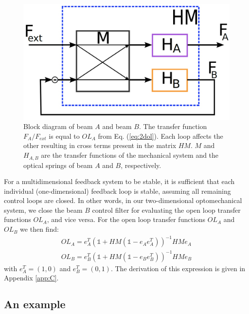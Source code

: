 \begin{figure}[htbp]
\begin{center}
		\includegraphics[width=.7\textwidth]{figures/theory/block_mimo_paper2c.png}
	\caption[Block diagram of beam $A$ and beam $B$]{Block diagram of beam $A$ and beam $B$. The transfer function $F_A/F_{ext}$ is equal to $OL_A$ from Eq. (\ref{eq:2dol}). Each loop affects the other resulting in cross terms
	present in the matrix $HM$. $M$ and $H_{A,B}$ are the transfer functions of the mechanical system and the optical springs of beam $A$ and $B$, respectively.}
	\label{fig:block_loops}
	\end{center}
\end{figure}


For a multidimensional feedback system to be stable, it is sufficient that each individual (one-dimensional) feedback loop is stable, assuming all remaining control loops are closed. In other words, in our two-dimensional optomechanical system, we close the beam $B$ control filter for evaluating the open loop transfer functions $OL_{A}$, and vice versa. For the open loop transfer functions $OL_{A}$ and $OL_{B}$ we then find: 
\begin{align}
\label{eq:2dol}
OL_{A}=e_A^{T}\left(\mathds{1}+HM (\mathds{1} - e_A e_A^T) \right)^{-1}HMe_A  \\
OL_{B}=e_B^{T}\left(\mathds{1}+HM (\mathds{1} - e_B e_B^T) \right)^{-1}HMe_B \nonumber
\end{align}
with $e_A^T=(1,0)$ and $e_B^T=(0,1)$. The derivation of this expression is given in Appendix \ref{app:C}.




\subsection{An example}


